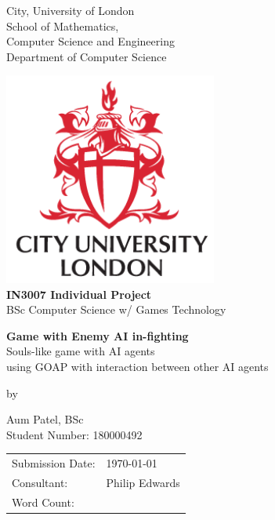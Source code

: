 \documentclass[11pt]{article}
\begin{document}
\begin{center}
\thispagestyle{empty}
\LARGE{City, University of London}\\[-0.8ex]
\LARGE{School of Mathematics, \\[-1.4ex]Computer Science and Engineering}\\[2ex]
\large{Department of Computer Science}\\
\vspace{0.3cm}
\begin{center}
\includegraphics[width=7cm]{casestudy-graphic-cul.png}\\
\vspace{0.9cm}
\textbf{\LARGE{IN3007 Individual Project}}
\\\large{BSc Computer Science w/ Games Technology}
\medskip\par
\vspace{1.2cm}
\Large{\textbf{Game with Enemy AI in-fighting}}\\[-0.5ex]
\large{Souls-like game with AI agents\\[-1ex] using GOAP with interaction between other AI agents}\\[-1.5ex]
\bigskip\par
by \par
\large{Aum Patel, BSc}\\[-1ex]
\large{Student Number: 180000492}\\ [-1ex]
\vspace{0.6cm}
\end{center}
\medskip
\end{center}
\begin{tabular}{ll}
  Submission Date:  & \today \\[-1ex]
  Consultant: & Philip Edwards\\[-1ex]
  Word Count: & 

\end{tabular}
\end{document}
